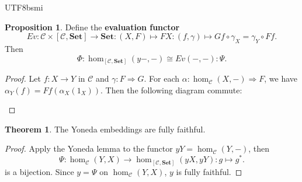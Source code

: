 \documentclass[12pt]{article}
\theoremstyle{definition}
\newtheorem{theorem}[definition]{Theorem}
\newtheorem{property}[definition]{Proposition}
\newcommand\<{\langle}
\renewcommand\>{\rangle}
\begin{document}
\begin{CJK}{UTF8}{bsmi}
\begin{property}
    Define the \textbf{evaluation functor}
    \[
        Ev:
        \mathcal{C}\times[\mathcal{C}, \textbf{Set}]\to\textbf{Set}:
        (X, F)\mapsto FX:
        (f, \gamma)\mapsto Gf\circ\gamma_X=\gamma_Y\circ Ff.
    \]
    Then
    \[
        \Phi:\hom_{[\mathcal{C}, \textbf{Set}]}(y-, -)\cong Ev(-, -):\Psi.
    \]
\end{property}
\begin{proof}
    Let $f:X\to Y$ in $\mathcal{C}$ and $\gamma:F\Rightarrow G$.
    For each $\alpha:\hom_\mathcal{C}(X, -)\Rightarrow F$, we have $\alpha_Y(f)=Ff(\alpha_X(1_X))$.
    Then the following diagram commute:
    \begin{center}
    \end{center}
\end{proof}

\begin{theorem}
    The Yoneda embeddings are fully faithful.
\end{theorem}
\begin{proof}
    Apply the Yoneda lemma to the functor $yY=\hom_\mathcal{C}(Y, -)$, then
    \[
        \Psi:
        \hom_\mathcal{C}(Y, X)
        \to \hom_{[\mathcal{C}, \textbf{Set}]}(yX, yY):g\mapsto g^*.
    \]
    is a bijection.
    Since $y=\Psi$ on $\hom_\mathcal{C}(Y, X)$, $y$ is fully faithful.
\end{proof}


\end{CJK}
\end{document}
